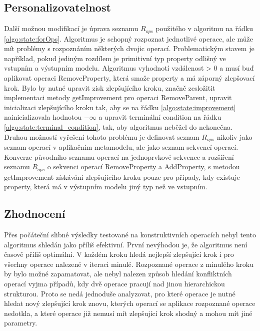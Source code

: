 \documentclass[11pt,twoside,a4paper]{book}
\begin{document}
\subsection{Personalizovatelnost}
Další možnou modifikací je úprava seznamu $R_{ops}$ použitého v algoritmu na
řádku \ref{algo:state:forOps}.
Algoritmus je schopný rozpoznat jednotlivé operace, ale může mít problémy s rozpoznáním
některých dvojic operací. Problematickým stavem je například, pokud jediným
rozdílem je primitivní typ property odlišný ve vstupním a výstupním modelu.
Algoritmus vyhodnotí vzdálenost > 0 a musí buď aplikovat operaci RemoveProperty,
která smaže property a má záporný zlepšovací krok. Bylo by nutné upravit
zisk zlepšujícího kroku, značně zesložitit implementaci metody getImprovement
pro operaci RemoveParent, upravit inicializaci zlepšujícího kroku tak, aby se
na řádku \ref{algo:state:improvement}
nainicializovala hodnotou $-\infty$ a
upravit terminální condition na řádku \ref{algo:state:terminal_condition}, tak,
aby algoritmus neběžel do nekonečna. Druhou možností vyřešení tohoto problému je
definovat seznam $R_{ops}$ nikoliv jako seznam operací v aplikačním
metamodelu, ale jako seznam sekvencí operací. Konverze původního seznamu operací
na jednoprvkové sekvence a rozšíření seznamu $R_{ops}$ o sekvenci operací
RemoveProperty a AddProperty, s metodou getImprovement získávání zlepšujícího
kroku pouze pro případy, kdy existuje property, která má v výstupním modelu
jiný typ než ve vstupním.


\subsection{Zhodnocení}     
Přes počáteční slibné výsledky testované na konstruktivních operacích nebyl
tento algoritmus shledán jako příliš efektivní. První nevýhodou je, že
algoritmus není časově příliš optimální. V každém kroku hledá nejlepší
zlepšující krok i pro všechny operace nalezené v iteraci minulé. Rozpoznané
operace z minulého kroku by bylo možné zapamatovat, ale nebyl nalezen způsob
hledání konfliktních operací vyjma případů, kdy dvě operace pracují nad jinou
hierarchickou strukturou. Proto se nedá jednoduše analyzovat, pro které operace
je nutné hledat nový zlepšující krok znovu, kterých operací se aplikace
rozpoznané operace nedotkla, a které operace již nemusí mít zlepšující krok
shodný a mohou mít jiné parametry.
\end{document}
